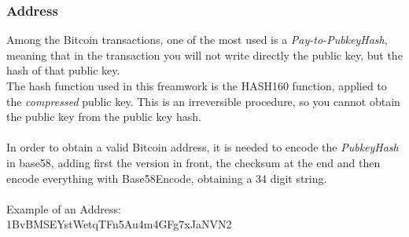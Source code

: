 \subsubsection{Address}
Among the Bitcoin transactions, one of the most used is a \textit{Pay-to-PubkeyHash}, meaning that in the transaction you will not write directly the public key, but the hash of that public key.
\\
The hash function used in this freamwork is the HASH160 function, applied to the \textit{compressed} public key. This is an irreversible procedure, so you cannot obtain the public key from the public key hash. \\ \\
In order to obtain a valid Bitcoin address, it is needed to encode the \textit{PubkeyHash} in base58, adding first the version in front, the checksum at the end and then encode everything with Base58Encode, obtaining a 34 digit string. 
\\ \\
Example of an Address: \\
1BvBMSEYstWetqTFn5Au4m4GFg7xJaNVN2



